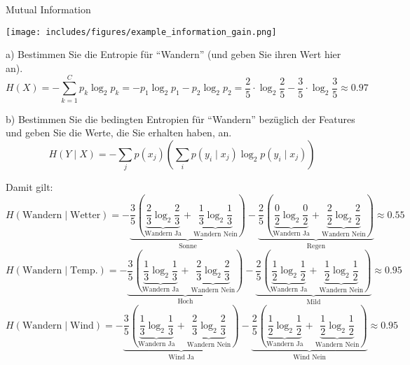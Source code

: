 \begin{example}{Mutual Information}
    \begin{center}
        \texttt{[image: includes/figures/example\_information\_gain.png]}
    \end{center}



    a) Bestimmen Sie die Entropie für \enquote{Wandern} (und geben Sie ihren Wert hier an).
    \[
        H(X) = - \sum_{k=1}^{C} p_k \log_2 p_k = - p_1 \log_2 p_1 - p_2 \log_2 p_2 = \frac{2}{5} \cdot \log_2 \frac{2}{5} - \frac{3}{5} \cdot \log_2 \frac{3}{5} \approx 0.97
    \]

    b) Bestimmen Sie die bedingten Entropien für \enquote{Wandern} bezüglich der Features und geben Sie die Werte, die Sie erhalten haben, an.
    \[
        H(Y \mid X) = - \sum_j p(x_j) \left( \sum_i p(y_i \mid x_j) \log_2 p(y_i \mid x_j) \right)
    \]

    Damit gilt:
    \[
        H(\text{Wandern} \mid \text{Wetter})
        = - \underbrace{\frac{3}{5} \left( \underbrace{\frac{2}{3} \log_2 \frac{2}{3}}_{\text{Wandern Ja}} + \underbrace{\frac{1}{3} \log_2 \frac{1}{3}}_{\text{Wandern Nein}} \right)}_{\text{Sonne}}
        - \underbrace{\frac{2}{5} \left( \underbrace{\frac{0}{2} \log_2 \frac{0}{2}}_{\text{Wandern Ja}} + \underbrace{\frac{2}{2} \log_2 \frac{2}{2}}_{\text{Wandern Nein}} \right)}_{\text{Regen}}
        \approx 0.55
    \]
    \[
        H(\text{Wandern} \mid \text{Temp.})
        = - \underbrace{\frac{3}{5} \left( \underbrace{\frac{1}{3} \log_2 \frac{1}{3}}_{\text{Wandern Ja}} + \underbrace{\frac{2}{3} \log_2 \frac{2}{3}}_{\text{Wandern Nein}} \right)}_{\text{Hoch}}
        - \underbrace{\frac{2}{5} \left( \underbrace{\frac{1}{2} \log_2 \frac{1}{2}}_{\text{Wandern Ja}} + \underbrace{\frac{1}{2} \log_2 \frac{1}{2}}_{\text{Wandern Nein}} \right)}_{\text{Mild}}
        \approx 0.95
    \]
    \[
        H(\text{Wandern} \mid \text{Wind})
        = - \underbrace{\frac{3}{5} \left( \underbrace{\frac{1}{3} \log_2 \frac{1}{3}}_{\text{Wandern Ja}} + \underbrace{\frac{2}{3} \log_2 \frac{2}{3}}_{\text{Wandern Nein}} \right)}_{\text{Wind Ja}}
        - \underbrace{\frac{2}{5} \left( \underbrace{\frac{1}{2} \log_2 \frac{1}{2}}_{\text{Wandern Ja}} + \underbrace{\frac{1}{2} \log_2 \frac{1}{2}}_{\text{Wandern Nein}} \right)}_{\text{Wind Nein}}
        \approx 0.95
    \]


\end{example}
